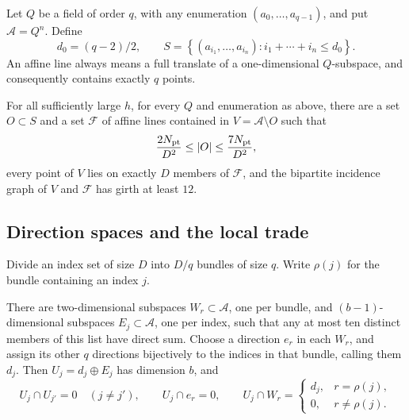Let $Q$ be a field of order $q$, with any enumeration
$(a_0,\ldots,a_{q-1})$, and put $\mathcal A=Q^n$.  Define
\begin{equation}\label{eq:hypergraph-lower-set}
 d_0=(q-2)/2,\qquad
 S=\left\{(a_{i_1},\ldots,a_{i_n}):
                  i_1+\cdots+i_n\le d_0\right\}.
\end{equation}
An affine line always means a full translate of a one-dimensional
$Q$-subspace, and consequently contains exactly $q$ points.

\begin{theorem}\label{thm:hypergraph}
For all sufficiently large $h$, for every $Q$ and enumeration as above,
there are a set $O\subset S$ and a set $\mathcal F$ of affine lines
contained in $V=\mathcal A\setminus O$ such that
\begin{equation}\label{eq:hypergraph-hole-size}
 \frac{2N_{\rm pt}}{D^2}\le |O|\le\frac{7N_{\rm pt}}{D^2},
\end{equation}
every point of $V$ lies on exactly $D$ members of $\mathcal F$, and
the bipartite incidence graph of $V$ and $\mathcal F$ has girth at
least $12$.
\end{theorem}

\subsection{Direction spaces and the local trade}

Divide an index set of size $D$ into $D/q$ bundles of size $q$.
Write $\rho(j)$ for the bundle containing an index $j$.

\begin{lemma}\label{lem:hypergraph-direction-spaces}
There are two-dimensional subspaces $W_r\subset\mathcal A$, one per
bundle, and $(b-1)$-dimensional subspaces $E_j\subset\mathcal A$,
one per index, such that any at most ten distinct members of this list
have direct sum.  Choose a direction $e_r$ in each $W_r$, and assign
its other $q$ directions bijectively to the indices in that bundle,
calling them $d_j$.  Then $U_j=d_j\oplus E_j$ has dimension $b$, and
\begin{equation}\label{eq:hypergraph-intersections}
 U_j\cap U_{j'}=0\quad(j\ne j'),\qquad
 U_j\cap e_r=0,\qquad
 U_j\cap W_r=
 \begin{cases}d_j,&r=\rho(j),\\0,&r\ne\rho(j).
 \end{cases}
\end{equation}
\end{lemma}

